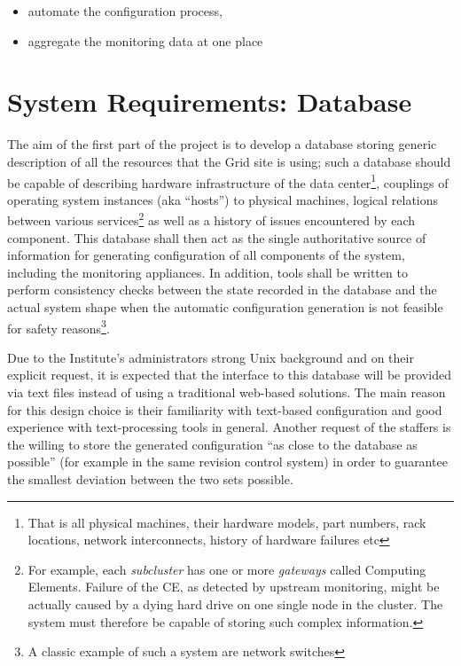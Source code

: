 \documentclass[12pt]{article}
\begin{document}
\begin{itemize}
    \item{automate the configuration process,}
    \item{aggregate the monitoring data at one place}
\end{itemize}

\section{System Requirements: Database}

The aim of the first part of the project is to develop a database storing generic description of all the resources that the Grid
site is using; such a database should be capable of describing hardware infrastructure of the data center\footnote{That is all
physical machines, their hardware models, part numbers, rack locations, network interconnects, history of hardware failures etc},
couplings of operating system instances (aka ``hosts'') to physical machines, logical relations between various
services\footnote{For example, each {\em subcluster} has one or more {\em gateways} called Computing Elements.  Failure of the CE,
as detected by upstream monitoring, might be actually caused by a dying hard drive on one single node in the cluster.  The system
must therefore be capable of storing such complex information.} as well as a history of issues encountered by each component.
This database shall then act as the single authoritative source of information for generating configuration of all components of
the system, including the monitoring appliances.  In addition, tools shall be written to perform consistency checks between the
state recorded in the database and the actual system shape when the automatic configuration generation is not feasible for safety
reasons\footnote{A classic example of such a system are network switches}.

Due to the Institute's administrators strong Unix background and on their explicit request, it is expected that the interface to
this database will be provided via text files instead of using a traditional web-based solutions.  The main reason for this design
choice is their familiarity with text-based configuration and good experience with text-processing tools in general.  Another
request of the staffers is the willing to store the generated configuration ``as close to the database as possible'' (for example
in the same revision control system) in order to guarantee the smallest deviation between the two sets possible.
\end{document}
